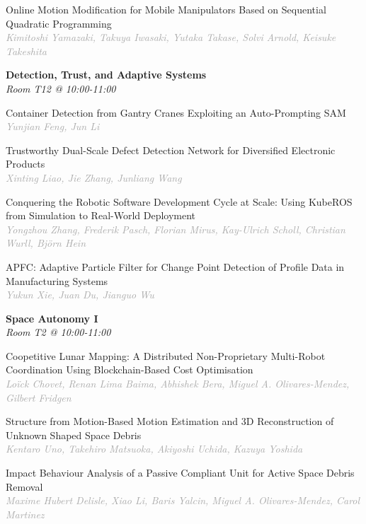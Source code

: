 \begin{multicols*}{2}
\small Online Motion Modification for Mobile Manipulators Based on Sequential Quadratic Programming\\ 
\footnotesize \textcolor{darkgray}{\textit{Kimitoshi Yamazaki, Takuya  Iwasaki, Yutaka  Takase, Solvi  Arnold, Keisuke  Takeshita}}

\normalsize \textbf{Detection, Trust, and Adaptive Systems}\\
\small \textit{Room T12 @ 10:00-11:00}

\small Container Detection from Gantry Cranes Exploiting an Auto-Prompting SAM\\ 
\footnotesize \textcolor{darkgray}{\textit{Yunjian Feng, Jun  Li}}

\small Trustworthy Dual-Scale Defect Detection Network for Diversified Electronic Products\\ 
\footnotesize \textcolor{darkgray}{\textit{Xinting Liao, Jie  Zhang, Junliang  Wang}}

\small Conquering the Robotic Software Development Cycle at Scale: Using KubeROS from Simulation to Real-World Deployment\\ 
\footnotesize \textcolor{darkgray}{\textit{Yongzhou Zhang, Frederik  Pasch, Florian  Mirus, Kay-Ulrich  Scholl, Christian  Wurll, Björn  Hein}}

\small APFC: Adaptive Particle Filter for Change Point Detection of Profile Data in Manufacturing Systems\\ 
\footnotesize \textcolor{darkgray}{\textit{Yukun Xie, Juan  Du, Jianguo  Wu}}

\normalsize \textbf{Space Autonomy I}\\
\small \textit{Room T2 @ 10:00-11:00}

\small Coopetitive Lunar Mapping: A Distributed Non-Proprietary Multi-Robot Coordination Using Blockchain-Based Cost Optimisation\\ 
\footnotesize \textcolor{darkgray}{\textit{Loïck Chovet, Renan  Lima Baima, Abhishek  Bera, Miguel A.  Olivares-Mendez, Gilbert  Fridgen}}

\small Structure from Motion-Based Motion Estimation and 3D Reconstruction of Unknown Shaped Space Debris\\ 
\footnotesize \textcolor{darkgray}{\textit{Kentaro Uno, Takehiro  Matsuoka, Akiyoshi  Uchida, Kazuya  Yoshida}}

\small Impact Behaviour Analysis of a Passive Compliant Unit for Active Space Debris Removal\\ 
\footnotesize \textcolor{darkgray}{\textit{Maxime Hubert Delisle, Xiao  Li, Baris  Yalcin, Miguel A.  Olivares-Mendez, Carol  Martinez}}


\end{multicols*}
